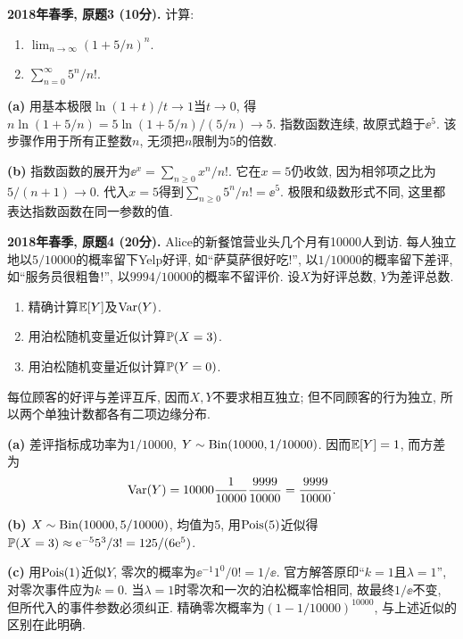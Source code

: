 \begin{exercise}\label{ex:m1-2018s-q3}
\textbf{2018年春季, 原题3 (10分).} 计算:
\begin{enumerate}\item[(a)]\label{ex:m1-2018s-q3-a} $\displaystyle\lim_{n\to\infty}(1+5/n)^n$.\item[(b)]\label{ex:m1-2018s-q3-b} $\displaystyle\sum_{n=0}^{\infty}5^n/n!$.\end{enumerate}
\end{exercise}
\begin{solution}
\textbf{(a)}\label{sol:m1-2018s-q3-a} 用基本极限$\ln(1+t)/t\to1$当$t\to0$, 得$n\ln(1+5/n)=5\ln(1+5/n)/(5/n)\to5$. 指数函数连续, 故原式趋于$\ee^5$. 该步骤作用于所有正整数$n$, 无须把$n$限制为5的倍数.

\textbf{(b)}\label{sol:m1-2018s-q3-b} 指数函数的展开为$\ee^x=\sum_{n\ge0}x^n/n!$. 它在$x=5$仍收敛, 因为相邻项之比为$5/(n+1)\to0$. 代入$x=5$得到$\sum_{n\ge0}5^n/n!=\ee^5$. 极限和级数形式不同, 这里都表达指数函数在同一参数的值.
\end{solution}

\begin{exercise}\label{ex:m1-2018s-q4}
\textbf{2018年春季, 原题4 (20分).} Alice的新餐馆营业头几个月有10000人到访. 每人独立地以$5/10000$的概率留下Yelp好评, 如“萨莫萨很好吃!”, 以$1/10000$的概率留下差评, 如“服务员很粗鲁!”, 以$9994/10000$的概率不留评价. 设$X$为好评总数, $Y$为差评总数.
\begin{enumerate}\item[(a)]\label{ex:m1-2018s-q4-a} 精确计算$\mathbb E[Y]$及$\operatorname{Var}(Y)$.\item[(b)]\label{ex:m1-2018s-q4-b} 用泊松随机变量近似计算$\mathbb P(X=3)$.\item[(c)]\label{ex:m1-2018s-q4-c} 用泊松随机变量近似计算$\mathbb P(Y=0)$.\end{enumerate}
\end{exercise}
\begin{solution}
每位顾客的好评与差评互斥, 因而$X,Y$不要求相互独立; 但不同顾客的行为独立, 所以两个单独计数都各有二项边缘分布.

\textbf{(a)}\label{sol:m1-2018s-q4-a} 差评指标成功率为$1/10000$, $Y\sim\operatorname{Bin}(10000,1/10000)$. 因而$\mathbb E[Y]=1$, 而方差为
\[
\operatorname{Var}(Y)=10000\frac1{10000}\frac{9999}{10000}=\frac{9999}{10000}.
\]

\textbf{(b)}\label{sol:m1-2018s-q4-b} $X\sim\operatorname{Bin}(10000,5/10000)$, 均值为5, 用$\operatorname{Pois}(5)$近似得$\mathbb P(X=3)\approx\mathrm e^{-5}5^3/3!=125/(6\mathrm e^5)$.

\textbf{(c)}\label{sol:m1-2018s-q4-c} 用$\operatorname{Pois}(1)$近似$Y$, 零次的概率为$\ee^{-1}1^0/0!=1/\ee$. 官方解答原印“$k=1$且$\lambda=1$”, 对零次事件应为$k=0$. 当$\lambda=1$时零次和一次的泊松概率恰相同, 故最终$1/\ee$不变, 但所代入的事件参数必须纠正. 精确零次概率为$(1-1/10000)^{10000}$, 与上述近似的区别在此明确.
\end{solution}

